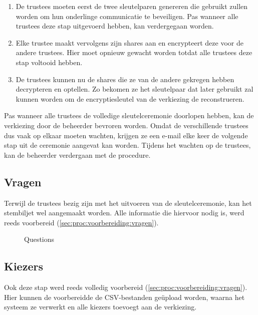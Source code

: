 
\begin{enumerate}
  \item De trustees moeten eerst de twee sleutelparen genereren die gebruikt zullen worden om hun onderlinge communicatie te beveiligen. Pas wanneer alle trustees deze stap uitgevoerd hebben, kan verdergegaan worden.
  \item Elke trustee maakt vervolgens zijn shares aan en encrypteert deze voor de andere trustees. Hier moet opnieuw gewacht worden totdat alle trustees deze stap voltooid hebben.
  \item De trustees kunnen nu de shares die ze van de andere gekregen hebben decrypteren en optellen. Zo bekomen ze het sleutelpaar dat later gebruikt zal kunnen worden om de encryptiesleutel van de verkiezing de reconstrueren.
\end{enumerate}

Pas wanneer alle trustees de volledige sleutelceremonie doorlopen hebben, kan de verkiezing door de beheerder bevroren worden. Omdat de verschillende trustees dus vaak op elkaar moeten wachten, krijgen ze een e-mail elke keer de volgende stap uit de ceremonie aangevat kan worden. Tijdens het wachten op de trustees, kan de beheerder verdergaan met de procedure.

\subsection{Vragen}

Terwijl de trustees bezig zijn met het uitvoeren van de sleutelceremonie, kan het stembiljet wel aangemaakt worden. Alle informatie die hiervoor nodig is, werd reeds voorbereid (\ref{sec:proc:voorbereiding:vragen}).

\begin{figure}
  \caption{Questions}
  \label{fig:proc:questions}
\end{figure}

\subsection{Kiezers}

Ook deze stap werd reeds volledig voorbereid (\ref{sec:proc:voorbereiding:vragen}). Hier kunnen de voorbereidde de CSV-bestanden ge\"upload worden, waarna het systeem ze verwerkt en alle kiezers toevoegt aan de verkiezing.

